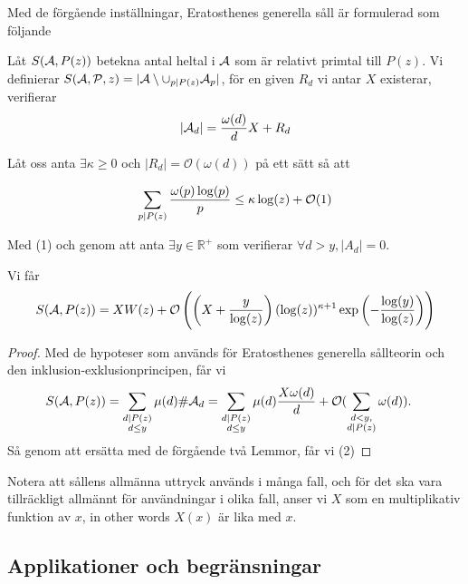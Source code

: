 Med de förgående inställningar, Eratosthenes generella såll är formulerad som följande\cite{Dalton}
\begin{theorem}\hfill

Låt $ S(\mathcal{A}, P(z)) $ betekna antal heltal i $ \mathcal{A} $ som är relativt primtal till $ P(z) $.
Vi definierar $S(\mathcal{\mathcal{A}}, \mathcal{\mathcal{P}}, z) =\vert \mathcal{A} \setminus \cup_{p\mid P(z)}\mathcal{A}_{p}\vert$, för en given $ R_{d} $ vi antar $ X $ existerar, verifierar
\[\vert\mathcal{A}_{d}\vert =\frac{\omega(d)}{d}X +R_{d} \]

Låt oss anta $ \exists \kappa\geq 0 $ och $ \vert R_{d}\vert = \mathcal{O}(\omega(d))$ på ett sätt så att

\[\sum_{p\mid P(z)}\frac{\omega(p)\log(p)}{p}\leq \kappa \log(z)+\mathcal{O}(1)\]


Med (1) och genom att anta $ \exists y\in \mathbb{R}^{+} $ som verifierar $ \forall d>y, \vert A_{d}\vert=0 $.

Vi får
\begin{equation}
S(\mathcal{A}, P(z))= XW(z)+\mathcal{O}\left( \left( X+\frac{y}{\log(z)} \right)(\log(z))^{\kappa+1}\exp \left( -\frac{\log(y)}{\log(z)} \right) \right)
\end{equation}
\end{theorem}
\begin{proof}
Med de hypoteser som används för Eratosthenes generella sållteorin och den inklusion-exklusionprincipen, får vi
\begin{align*}
S(\mathcal{A}, P(z))&=\sum_{\substack{d\mid P(z)\\d\leq y}}\mu(d)\#\mathcal{A}_{d} =\sum_{\substack{d\mid P(z)\\d\leq y}}\mu(d)\frac{X\omega(d)}{d}+\mathcal{O}(\sum_{\substack{d<y,\\ d \mid P(z)}} \omega(d)).
\end{align*}
Så genom att ersätta med de förgående två Lemmor, får vi (2)
\end{proof}
Notera att sållens allmänna uttryck används i många fall, och för det ska vara tillräckligt allmännt för användningar i olika fall, anser vi $ X $ som en multiplikativ funktion av $ x $, in other words $ X(x) $ är lika med $ x $. 

\subsection{Applikationer och begränsningar}

